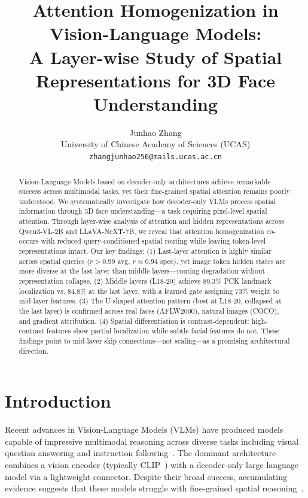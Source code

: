 \documentclass[10pt,twocolumn,letterpaper]{article}
\title{\vspace{-0.5in}Attention Homogenization in Vision-Language Models:\\
A Layer-wise Study of Spatial Representations for 3D Face Understanding}
\author{
  Junhao Zhang \\
  University of Chinese Academy of Sciences (UCAS) \\
  \texttt{zhangjunhao256@mails.ucas.ac.cn}
}
\begin{document}
\maketitle
\thispagestyle{empty}

\begin{abstract}
Vision-Language Models based on decoder-only architectures achieve remarkable success across multimodal tasks, yet their fine-grained spatial attention remains poorly understood. We systematically investigate how decoder-only VLMs process spatial information through 3D face understanding---a task requiring pixel-level spatial attention. Through layer-wise analysis of attention and hidden representations across Qwen3-VL-2B and LLaVA-NeXT-7B, we reveal that attention homogenization co-occurs with reduced query-conditioned spatial routing while leaving token-level representations intact. Our key findings: (1) Last-layer attention is highly similar across spatial queries ($r>0.99$ avg, $r\approx0.94$ spec), yet image token hidden states are more diverse at the last layer than middle layers---routing degradation without representation collapse. (2) Middle layers (L18-20) achieve 89.3\% PCK landmark localization vs. 84.8\% at the last layer, with a learned gate assigning 73\% weight to mid-layer features. (3) The U-shaped attention pattern (best at L18-20, collapsed at the last layer) is confirmed across real faces (AFLW2000), natural images (COCO), and gradient attribution. (4) Spatial differentiation is contrast-dependent: high-contrast features show partial localization while subtle facial features do not. These findings point to mid-layer skip connections---not scaling---as a promising architectural direction.
\end{abstract}

\section{Introduction}
\label{sec:intro}

Recent advances in Vision-Language Models (VLMs) have produced models capable of impressive multimodal reasoning across diverse tasks including visual question answering and instruction following~\cite{LLaVA,Qwen3VL}. The dominant architecture combines a vision encoder (typically CLIP~\cite{CLIP}) with a decoder-only large language model via a lightweight connector. Despite their broad success, accumulating evidence suggests that these models struggle with fine-grained spatial reasoning~\cite{SpatialVLM}.
\end{document}
